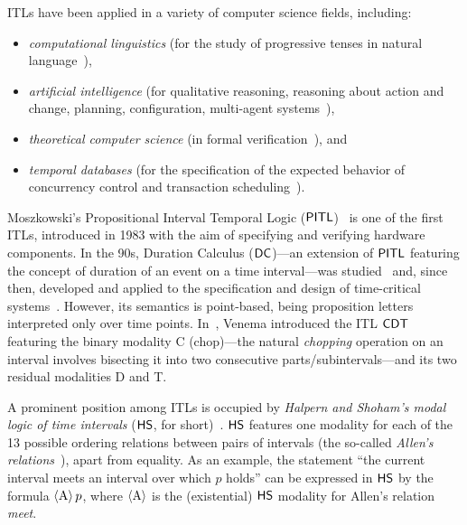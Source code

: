 ITLs have been applied in a variety of computer
science fields, including:  
\begin{itemize}
    \item \emph{computational linguistics} (for the study of progressive tenses in natural language~\cite{DBLP:journals/ai/Pratt-Hartmann05}),
    \item \emph{artificial intelligence} (for qualitative reasoning, reasoning about action and
change, planning, 
configuration, multi-agent systems~\cite{DBLP:journals/logcom/BowmanT03,DBLP:conf/ecp/GiunchigliaT99,DBLP:conf/tacas/LomuscioR06}),
    \item \emph{theoretical computer science} (in formal verification~\cite{DBLP:series/eatcs/ChaochenH04,digital_circuits_thesis}), and
    \item \emph{temporal databases} (for the specification of the expected behavior of concurrency control and transaction scheduling~\cite{roadmap_intervals}).
\end{itemize}

Moszkowski's Propositional Interval Temporal Logic ($\text{\sffamily PITL}$)~\cite{digital_circuits_thesis}
is one of the first ITLs, introduced in 1983 with the aim of specifying and verifying hardware components.
In the 90s, Duration Calculus ($\text{\sffamily DC}$)---an extension of $\text{\sffamily PITL}$ featuring the concept of duration of an event on a time interval---was studied~\cite{CHAOCHEN1991269} and, since then, developed and applied to the specification and design of time-critical systems~\cite{DBLP:series/eatcs/ChaochenH04,Hansen2007}.
However, its semantics is point-based, being proposition letters interpreted only over time points.
%
In~\cite{chopping_intervals}, Venema introduced the ITL $\text{\sffamily CDT}$ featuring the binary modality C (chop)---the natural \emph{chopping} operation on an interval involves bisecting it into two consecutive parts/subintervals---and its two residual modalities D and T.


A prominent position among ITLs is occupied by \emph{Halpern
and Shoham's modal logic of time intervals} ($\text{\sffamily HS}$, for short)~\cite{HS91}.
$\text{\sffamily HS}$ features one modality for each of the 13 possible ordering
relations between pairs of intervals (the so-called \emph{Allen's
relations}~\cite{All83}), apart from equality.
As an example, the statement ``the current interval meets an interval over
which $p$ holds'' can be expressed in $\text{\sffamily HS}$ by the formula $\operatorname{\langle A\rangle} p$,
where $\operatorname{\langle A\rangle}$ is the (existential) $\text{\sffamily HS}$ modality for Allen's relation
\emph{meet}.

